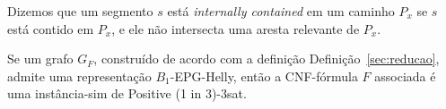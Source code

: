 \begin{definition}
Dizemos que um segmento $s$ está \emph{internally contained} em um caminho $P_x$ se $s$ está contido em $P_x$, e ele não intersecta uma aresta relevante de  $P_x$. 
\end{definition}



\begin{lema}\label{lem:volta}
Se um grafo $G_F$, construído de acordo com a definição  Definição~\ref{sec:reducao}, admite uma representação $B_1$-EPG-Helly, então a CNF-fórmula $F$ associada é uma instância-sim de {\sc Positive (1 in 3)-3sat}.
\end{lema}

